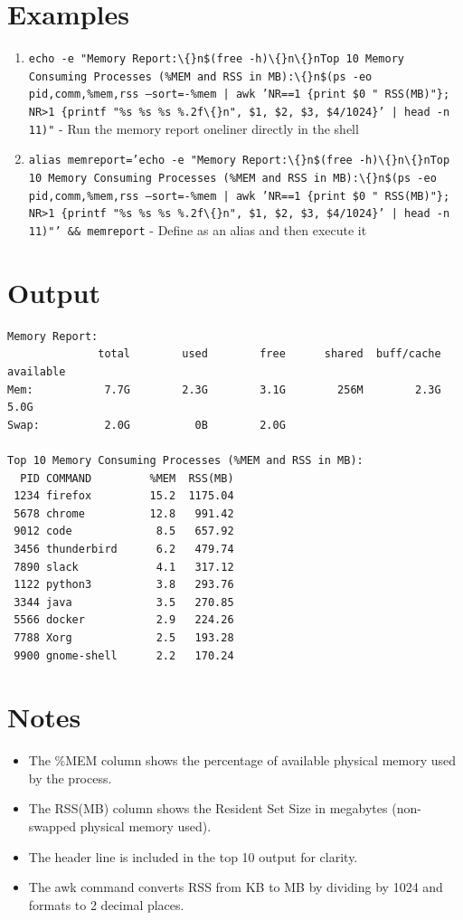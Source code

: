 \documentclass[openany]{book}
\begin{document}
\section*{Examples}
\begin{enumerate}
  \item \texttt{echo -e "Memory Report:\textbackslash\{\}n\$(free -h)\textbackslash\{\}n\textbackslash\{\}nTop 10 Memory Consuming Processes (\%MEM and RSS in MB):\textbackslash\{\}n\$(ps -eo pid,comm,\%mem,rss --sort=-\%mem | awk 'NR==1 \{print \$0 " RSS(MB)"\}; NR>1 \{printf "\%s \%s \%s \%.2f\textbackslash\{\}n", \$1, \$2, \$3, \$4/1024\}' | head -n 11)"} - Run the memory report oneliner directly in the shell
  \item \texttt{alias memreport='echo -e "Memory Report:\textbackslash\{\}n\$(free -h)\textbackslash\{\}n\textbackslash\{\}nTop 10 Memory Consuming Processes (\%MEM and RSS in MB):\textbackslash\{\}n\$(ps -eo pid,comm,\%mem,rss --sort=-\%mem | awk 'NR==1 \{print \$0 " RSS(MB)"\}; NR>1 \{printf "\%s \%s \%s \%.2f\textbackslash\{\}n", \$1, \$2, \$3, \$4/1024\}' | head -n 11)"' \&\& memreport} - Define as an alias and then execute it
\end{enumerate}

\section*{Output}
\begin{lstlisting}
Memory Report:
              total        used        free      shared  buff/cache   available
Mem:           7.7G        2.3G        3.1G        256M        2.3G        5.0G
Swap:          2.0G          0B        2.0G

Top 10 Memory Consuming Processes (%MEM and RSS in MB):
  PID COMMAND         %MEM  RSS(MB)
 1234 firefox         15.2  1175.04
 5678 chrome          12.8   991.42
 9012 code             8.5   657.92
 3456 thunderbird      6.2   479.74
 7890 slack            4.1   317.12
 1122 python3          3.8   293.76
 3344 java             3.5   270.85
 5566 docker           2.9   224.26
 7788 Xorg             2.5   193.28
 9900 gnome-shell      2.2   170.24
\end{lstlisting}

\section*{Notes}
\begin{itemize}
  \item The \%MEM column shows the percentage of available physical memory used by the process.
  \item The RSS(MB) column shows the Resident Set Size in megabytes (non-swapped physical memory used).
  \item The header line is included in the top 10 output for clarity.
  \item The awk command converts RSS from KB to MB by dividing by 1024 and formats to 2 decimal places.
\end{itemize}
\end{document}
